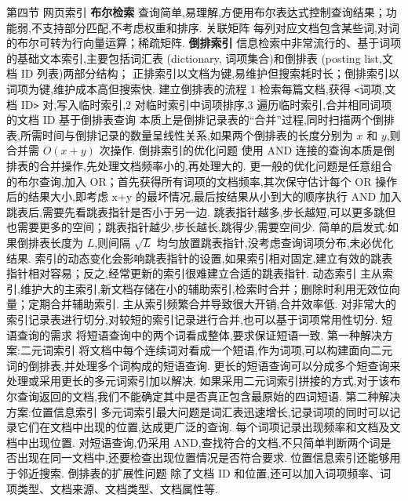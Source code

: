 \documentclass[10pt, utf8]{ctexart}
\begin{document}
\begin{multicols}{4}
    {\color{orange_}第四节 网页索引}
    {\color{purple_}\textbf{布尔检索}} 查询简单,易理解,方便用布尔表达式控制查询结果；功能弱,不支持部分匹配,不考虑权重和排序.
    {\color{blue}关联矩阵} 每列对应文档包含某些词,对词的布尔可转为行向量运算；稀疏矩阵.
    {\color{purple_}\textbf{倒排索引}}
    信息检索中非常流行的、基于词项的基础文本索引,主要包括词汇表 (dictionary, 词项集合)和倒排表 (posting list,文档 ID 列表)两部分结构；
    正排索引以文档为键,易维护但搜索耗时长；倒排索引以词项为键,维护成本高但搜索快.
    {\color{blue}建立倒排表的流程}
    1 检索每篇文档,获得 \verb|<|词项,文档 ID\verb|>| 对,写入临时索引,2 对临时索引中词项排序,3 遍历临时索引,合并相同词项的文档 ID
        {\color{blue}基于倒排表查询}
    本质上是倒排记录表的“合并”过程,同时扫描两个倒排表,所需时间与倒排记录的数量呈线性关系,如果两个倒排表的长度分别为 $x$ 和 $y$,则合并需 $O(x+y)$ 次操作.
    {\color{blue}倒排索引的优化问题}
    使用 AND 连接的查询本质是倒排表的合并操作,先处理文档频率小的,再处理大的.
    更一般的优化问题是任意组合的布尔查询,加入 OR；首先获得所有词项的文档频率,其次保守估计每个 OR 操作后的结果大小,即考虑 x+y 的最坏情况,最后按结果从小到大的顺序执行 AND
    加入跳表后,需要先看跳表指针是否小于另一边.
    跳表指针越多,步长越短,可以更多跳但也需要更多的空间；跳表指针越少,步长越长,跳得少,需要空间少.
    简单的启发式:如果倒排表长度为 $L$,则间隔 $\sqrt{L}$ 均匀放置跳表指针,没考虑查询词项分布,未必优化结果.
    索引的动态变化会影响跳表指针的设置,如果索引相对固定,建立有效的跳表指针相对容易；反之,经常更新的索引很难建立合适的跳表指针.
    {\color{blue}动态索引}
    主从索引,维护大的主索引,新文档存储在小的辅助索引,检索时合并；删除时利用无效位向量；定期合并辅助索引.
    主从索引频繁合并导致很大开销,合并效率低.
    对非常大的索引记录表进行切分,对较短的索引记录进行合并,也可以基于词项常用性切分.
    {\color{blue}短语查询的需求}
    将短语查询中的两个词看成整体,要求保证短语一致.
    {\color{blue}第一种解决方案:二元词索引}
    将文档中每个连续词对看成一个短语,作为词项,可以构建面向二元词的倒排表,并处理多个词构成的短语查询.
    更长的短语查询可以分成多个短查询来处理或采用更长的多元词索引加以解决.
    如果采用二元词索引拼接的方式,对于该布尔查询返回的文档,我们不能确定其中是否真正包含最原始的四词短语.
    {\color{blue}第二种解决方案:位置信息索引}
    多元词索引最大问题是词汇表迅速增长,记录词项的同时可以记录它们在文档中出现的位置,达成更广泛的查询.
    每个词项记录出现频率和文档及文档中出现位置.
    对短语查询,仍采用 AND,查找符合的文档,不只简单判断两个词是否出现在同一文档中,还要检查出现位置情况是否符合要求.
    位置信息索引还能够用于邻近搜索.
    {\color{blue}倒排表的扩展性问题}
    除了文档 ID 和位置,还可以加入词项频率、词项类型、文档来源、文档类型、文档属性等.

\end{multicols}
\end{document}
